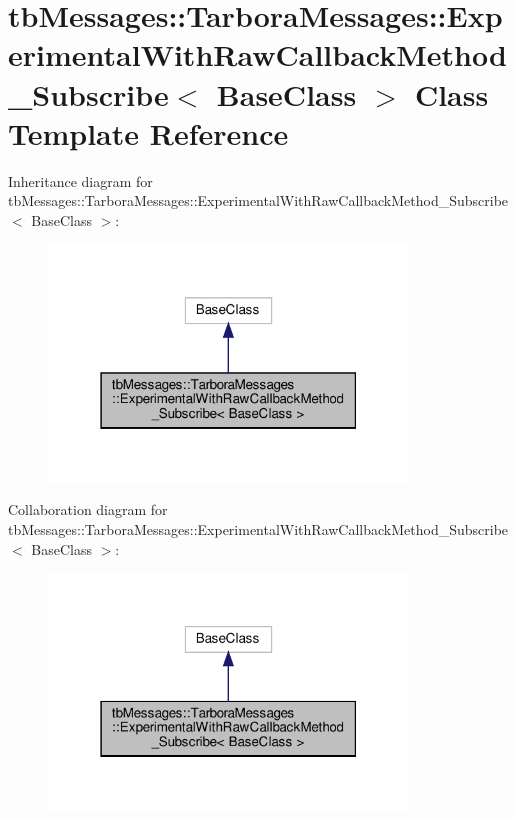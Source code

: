 \hypertarget{classtbMessages_1_1TarboraMessages_1_1ExperimentalWithRawCallbackMethod__Subscribe}{}\section{tb\+Messages\+:\+:Tarbora\+Messages\+:\+:Experimental\+With\+Raw\+Callback\+Method\+\_\+\+Subscribe$<$ Base\+Class $>$ Class Template Reference}
\label{classtbMessages_1_1TarboraMessages_1_1ExperimentalWithRawCallbackMethod__Subscribe}


Inheritance diagram for tb\+Messages\+:\+:Tarbora\+Messages\+:\+:Experimental\+With\+Raw\+Callback\+Method\+\_\+\+Subscribe$<$ Base\+Class $>$\+:
\nopagebreak
\begin{figure}[H]
\begin{center}
\leavevmode
\includegraphics[width=271pt]{classtbMessages_1_1TarboraMessages_1_1ExperimentalWithRawCallbackMethod__Subscribe__inherit__graph}
\end{center}
\end{figure}


Collaboration diagram for tb\+Messages\+:\+:Tarbora\+Messages\+:\+:Experimental\+With\+Raw\+Callback\+Method\+\_\+\+Subscribe$<$ Base\+Class $>$\+:
\nopagebreak
\begin{figure}[H]
\begin{center}
\leavevmode
\includegraphics[width=271pt]{classtbMessages_1_1TarboraMessages_1_1ExperimentalWithRawCallbackMethod__Subscribe__coll__graph}
\end{center}
\end{figure}
